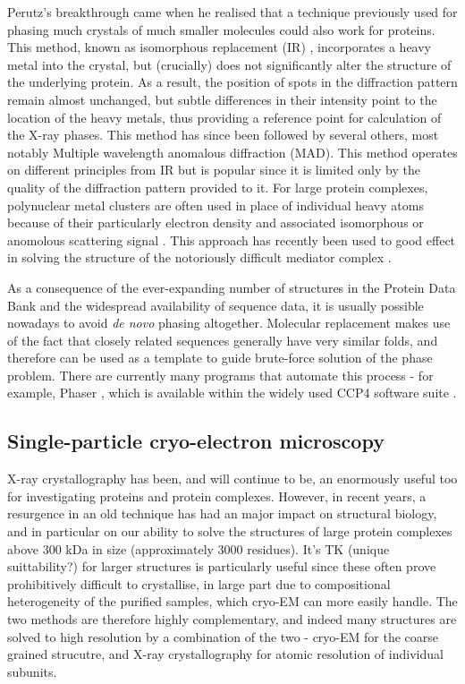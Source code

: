 \documentclass[a4paper,11pt,twoside,openright]{scrbook}
\begin{document}
Perutz's breakthrough came when he realised that a technique previously used for phasing much crystals of much smaller molecules could also work for proteins. This method, known as isomorphous replacement (IR)  \cite{Robertson1936}, incorporates a heavy metal into the crystal, but (crucially) does not significantly alter the structure of the underlying protein. As a result, the position of spots in the diffraction pattern remain almost unchanged, but subtle differences in their intensity point to the location of the heavy metals, thus providing a reference point for calculation of the X-ray phases. This method has since been followed by several others, most notably Multiple wavelength anomalous diffraction (MAD). This method operates on different principles from IR but is popular since it is limited only by the quality of the diffraction pattern provided to it. For large protein complexes, polynuclear metal clusters are often used in place of individual heavy atoms because of their particularly electron density and associated isomorphous or anomolous scattering signal \cite{Dauter2005}. This approach has recently been used to good effect in solving the structure of the notoriously difficult mediator complex \cite{Nozawa2017}.

As a consequence of the ever-expanding number of structures in the Protein Data Bank and the widespread availability of sequence data, it is usually possible nowadays to avoid \textit{de novo} phasing altogether. Molecular replacement makes use of the fact that closely related sequences generally have very similar folds, and therefore can be used as a template to guide brute-force solution of the phase problem. There are currently many programs that automate this process - for example, Phaser \cite{McCoy2007}, which is available within the widely used CCP4 software suite \cite{Winn2011a}.


\subsection{Single-particle cryo-electron microscopy}

X-ray crystallography has been, and will continue to be, an enormously useful too for investigating proteins and protein complexes. However, in recent years, a resurgence in an old technique has had an major impact on structural biology, and in particular on our ability to solve the structures of large protein complexes above 300 kDa in size (approximately 3000 residues). It's TK (unique suittability?) for larger structures is particularly useful since these often prove prohibitively difficult to crystallise, in large part due to compositional heterogeneity of the purified samples, which cryo-EM can more easily handle. The two methods are therefore highly complementary, and indeed many structures are solved to high resolution by a combination of the two - cryo-EM for the coarse grained strucutre, and X-ray crystallography for atomic resolution of individual subunits.
\end{document}
